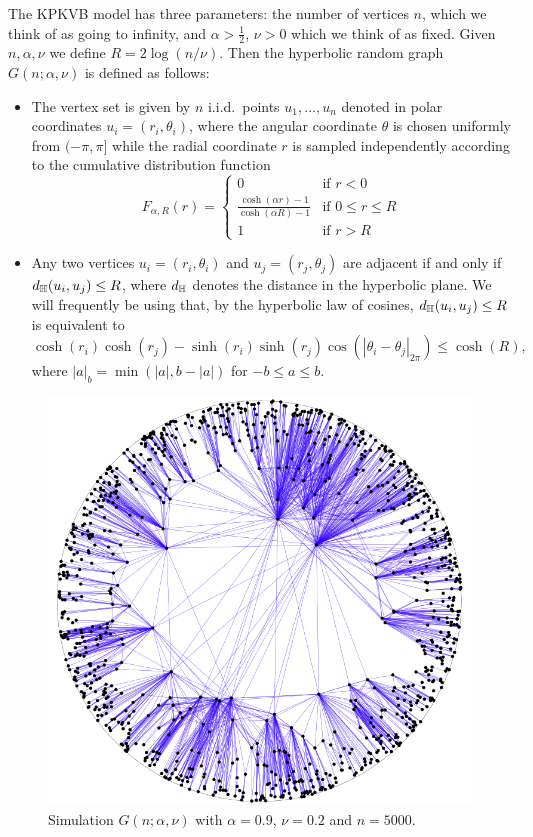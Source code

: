 The KPKVB model has three parameters: the number of vertices $n$, which we think of as going to infinity, and $\alpha > \frac{1}{2}$, $\nu > 0$ which we think of as fixed. Given $n, \alpha, \nu$ we define $R = 2\log(n/\nu)$. Then the hyperbolic random graph $G(n;\alpha, \nu)$ is defined as follows:
\begin{itemize}
\item The vertex set is given by $n$ i.i.d.~points $u_1, \dots, u_n$ denoted in polar coordinates $u_i = (r_i, \theta_i)$, where the angular coordinate $\theta$ is chosen uniformly from $(-\pi,\pi]$ while the radial coordinate $r$ is sampled independently according to the cumulative distribution function
\begin{equation}\label{eq:def_hyperbolic_point_distribution}
	F_{\alpha,R}(r) = \begin{cases}
		0 &\mbox{if } r < 0\\
		\frac{\cosh(\alpha r)-1}{\cosh(\alpha R) - 1} &\mbox{if } 0 \le r \le R\\
		1&\mbox{if } r > R
	\end{cases}
\end{equation}
\item Any two vertices $u_i=(r_i,\theta_i)$ and $u_j=(r_j,\theta_j)$ are adjacent if and only if $d_{\mathbb{H}}(u_i,u_j) \le R$, where $d_{\mathbb{H}}$ denotes the distance in the hyperbolic plane. We will frequently be using that, by the hyperbolic law of cosines, $d_{\mathbb{H}}(u_i,u_j) \le R$ is equivalent to
\[
	\cosh(r_i) \cosh(r_j) - \sinh(r_i) \sinh( r_j) \cos(|\theta_i-\theta_j|_{2\pi}) \le \cosh(R),
\]
where $|a|_{b} = \min( |a|, b - |a|)$ for $-b\leq a\leq b$.
\end{itemize}

\begin{figure}[!t]
\centering
\includegraphics[scale=0.3]{figures/KPKVB.png}
\caption{Simulation $G(n;\alpha, \nu)$ with $\alpha = 0.9$, $\nu = 0.2$ and $n = 5000$.}
\label{fig:H_graph_example}
\end{figure}

